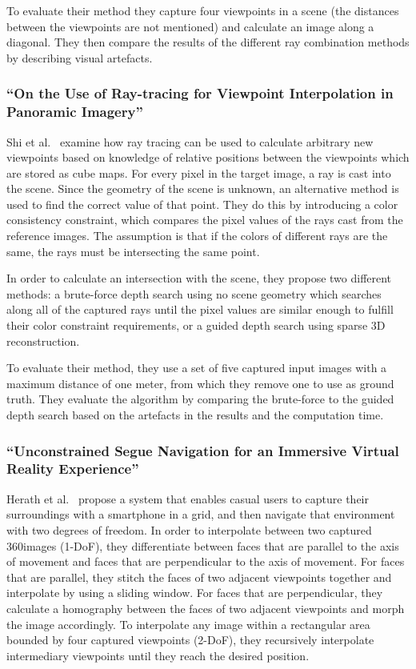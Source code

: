 To evaluate their method they capture four viewpoints in a scene (the distances between the viewpoints are not mentioned) and calculate an image along a diagonal. They then compare the results of the different ray combination methods by describing visual artefacts.

\subsubsection{``On the Use of Ray-tracing for Viewpoint Interpolation in Panoramic Imagery'' \cite{raytracing}}
Shi et al.\ \cite{raytracing} examine how ray tracing can be used to calculate arbitrary new viewpoints based on knowledge of relative positions between the viewpoints which are stored as cube maps. For every pixel in the target image, a ray is cast into the scene. Since the geometry of the scene is unknown, an alternative method is used to find the correct value of that point. They do this by introducing a color consistency constraint, which compares the pixel values of the rays cast from the reference images. The assumption is that if the colors of different rays are the same, the rays must be intersecting the same point.

In order to calculate an intersection with the scene, they propose two different methods: a brute-force depth search using no scene geometry which searches along all of the captured rays until the pixel values are similar enough to fulfill their color constraint requirements, or a guided depth search using sparse 3D reconstruction.

To evaluate their method, they use a set of five captured input images with a maximum distance of one meter, from which they remove one to use as ground truth. They evaluate the algorithm by comparing the brute-force to the guided depth search based on the artefacts in the results and the computation time.

\subsubsection{``Unconstrained Segue Navigation for an Immersive Virtual Reality Experience'' \cite{segue}}
Herath et al.\ \cite{segue} propose a system that enables casual users to capture their surroundings with a smartphone in a grid, and then navigate that environment with two degrees of freedom. In order to interpolate between two captured 360\degree images (1-DoF), they differentiate between faces that are parallel to the axis of movement and faces that are perpendicular to the axis of movement. For faces that are parallel, they stitch the faces of two adjacent viewpoints together and interpolate by using a sliding window. For faces that are perpendicular, they calculate a homography between the faces of two adjacent viewpoints and morph the image accordingly. To interpolate any image within a rectangular area bounded by four captured viewpoints (2-DoF), they recursively interpolate intermediary viewpoints until they reach the desired position.

